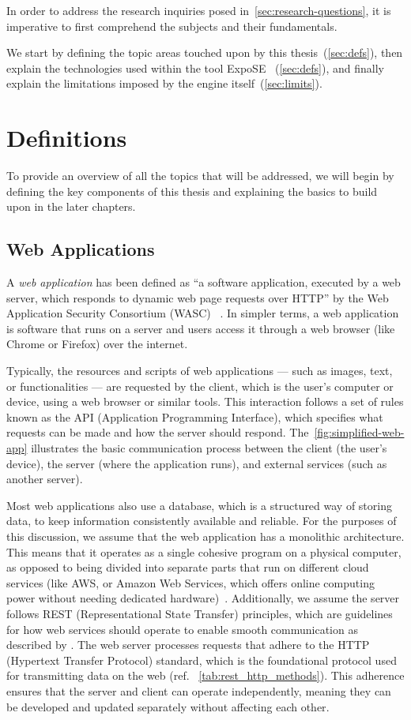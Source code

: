 In order to address the research inquiries posed in~\autoref{sec:research-questions}, it is imperative to first comprehend the subjects and their fundamentals. 

We start by defining the topic areas touched upon by this thesis~(\autoref{sec:defs}), then explain the technologies used within the tool ExpoSE ~(\autoref{sec:defs}), and finally explain the limitations imposed by the engine itself~(\autoref{sec:limits}). 

\section{Definitions}
\label{sec:defs}
To provide an overview of all the topics that will be addressed, we will begin by defining the key components of this thesis and explaining the basics to build upon in the later chapters. 
\subsection{Web Applications}
\label{sec:webapp}
A \textit{web application} has been defined as “a software application, executed by a web server, which responds to dynamic web page requests over HTTP” by the Web Application Security Consortium (WASC) ~\cite{noauthor_web_2012}. 
In simpler terms, a web application is software that runs on a server and users access it through a web browser (like Chrome or Firefox) over the internet.

Typically, the resources and scripts of web applications — such as images, text, or functionalities — are requested by the client, which is the user's computer or device, using a web browser or similar tools. This interaction follows a set of rules known as the API (Application Programming Interface), which specifies what requests can be made and how the server should respond.
The~\autoref{fig:simplified-web-app} illustrates the basic communication process between the client (the user's device), the server (where the application runs), and external services (such as another server).


Most web applications also use a database, which is a structured way of storing data, to keep information consistently available and reliable. For the purposes of this discussion, we assume that the web application has a monolithic architecture. This means that it operates as a single cohesive program on a physical computer, as opposed to being divided into separate parts that run on different cloud services (like AWS, or Amazon Web Services, which offers online computing power without needing dedicated hardware)~\cite{noauthor_serverless_nodate}.
Additionally, we assume the server follows REST (Representational State Transfer) principles, which are guidelines for how web services should operate to enable smooth communication as described by \citet{roy_t_fielding_rest_2008}. 
The web server processes requests that adhere to the HTTP (Hypertext Transfer Protocol) standard, which is the foundational protocol used for transmitting data on the web (ref. ~\autoref{tab:rest_http_methods}).
This adherence ensures that the server and client can operate independently, meaning they can be developed and updated separately without affecting each other\cite{fielding_http_2022}.

